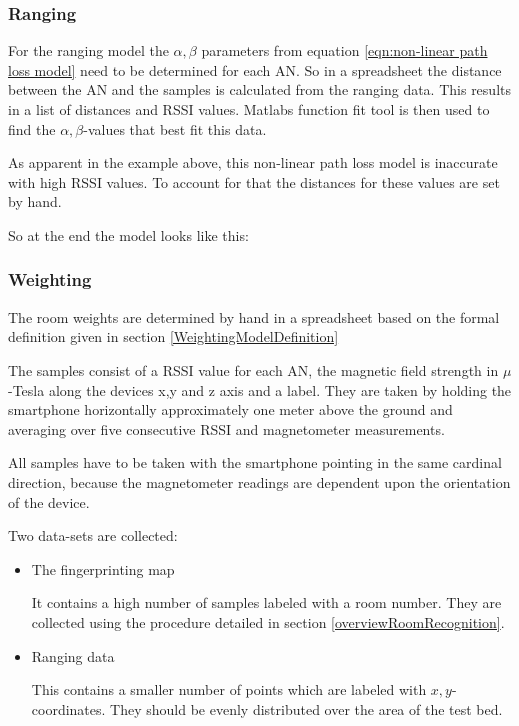 \subsubsection{Ranging}
For the ranging model the \(\alpha, \beta\) parameters from equation \ref{eqn:non-linear path loss model} need to be determined for each AN. So in a spreadsheet the distance between the AN and the samples is calculated from the ranging data. This results in a list of distances and RSSI values. Matlabs function fit tool is then used to find the \(\alpha, \beta\)-values that best fit this data.

As apparent in the example above, this non-linear path loss model is inaccurate with high RSSI values. To account for that the distances for these values are set by hand.

So at the end the model looks like this:


\subsubsection{Weighting}

The room weights are determined by hand in a spreadsheet based on the formal definition given in section \ref{WeightingModelDefinition}

The samples consist of a RSSI value for each AN, the magnetic field strength in \(\mu\)-Tesla along the devices x,y and z axis and a label. They are taken by holding the smartphone horizontally approximately one meter above the ground and averaging over five 
consecutive RSSI and magnetometer measurements.

All samples have to be taken with the smartphone pointing in the same cardinal direction, because the magnetometer readings are dependent upon the orientation of the device.


Two data-sets are collected:

\begin{itemize}
\item The fingerprinting map

It contains a high number of samples labeled with a room number. They are collected using the procedure detailed in section \ref{overviewRoomRecognition}.

\item Ranging data

This contains a smaller number of points which are labeled with \(x,y\)-coordinates. They should be evenly distributed over the area of the test bed.
\end{itemize}


